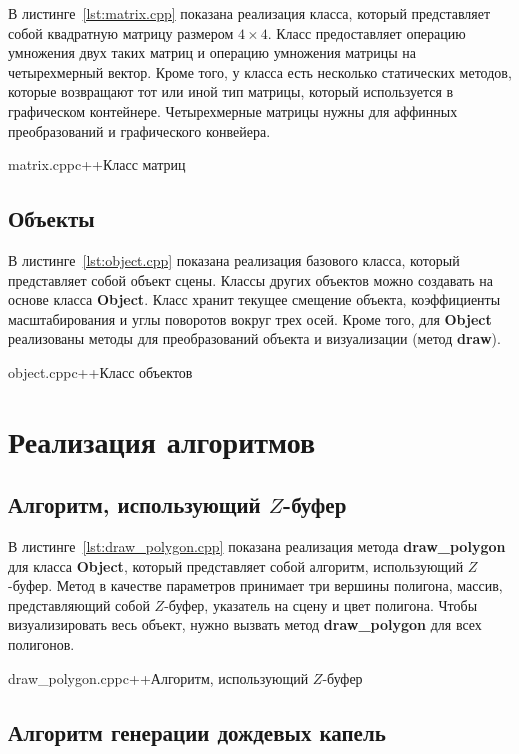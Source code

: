 В листинге~\ref{lst:matrix.cpp} показана реализация класса, который представляет собой квадратную матрицу размером $4 \times 4$. 
Класс предоставляет операцию умножения двух таких матриц и операцию умножения матрицы на четырехмерный вектор. 
Кроме того, у класса есть несколько статических методов, которые возвращают тот или иной тип матрицы, который используется в графическом контейнере. 
Четырехмерные матрицы нужны для аффинных преобразований и графического конвейера.

{matrix.cpp}{c++}{Класс матриц}

\subsection{Объекты}

В листинге~\ref{lst:object.cpp} показана реализация базового класса, который представляет собой объект сцены. 
Классы других объектов можно создавать на основе класса \textbf{Object}. 
Класс хранит текущее смещение объекта, коэффициенты масштабирования и углы поворотов вокруг трех осей. 
Кроме того, для \textbf{Object} реализованы методы для преобразований объекта и визуализации (метод \textbf{draw}).

{object.cpp}{c++}{Класс объектов}

\section{Реализация алгоритмов}

\subsection{Алгоритм, использующий $Z$-буфер}

В листинге~\ref{lst:draw_polygon.cpp} показана реализация метода \textbf{draw\_polygon} для класса \textbf{Object}, который представляет собой алгоритм, использующий $Z$-буфер. 
Метод в качестве параметров принимает три вершины полигона, массив, представляющий собой $Z$-буфер, указатель на сцену и цвет полигона. 
Чтобы визуализировать весь объект, нужно вызвать метод \textbf{draw\_polygon} для всех полигонов.

{draw_polygon.cpp}{c++}{Алгоритм, использующий $Z$-буфер}

\subsection{Алгоритм генерации дождевых капель}

